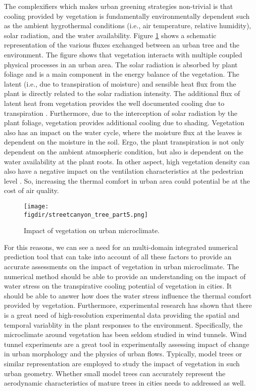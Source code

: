 The complexifiers which makes urban greening strategies non-trivial is that cooling provided by vegetation is fundamentally environmentally dependent such as the ambient hygrothermal conditions (i.e., air temperature, relative humidity), solar radiation, and the water availability. Figure \ref{fig:vegetation_fluxes} shows a schematic representation of the various fluxes exchanged between an urban tree and the environment. The figure shows that vegetation interacts with multiple coupled physical processes in an urban area. The solar radiation is absorbed by plant foliage and is a main component in the energy balance of the vegetation. The latent (i.e., due to transpiration of moisture) and sensible heat flux from the plant is directly related to the solar radiation intensity. The additional flux of latent heat from vegetation provides the well documented cooling due to transpiration \citep{Oke2017,Farquhar2007, abtew2012evaporation,Melesse2008}. Furthermore, due to the interception of solar radiation by the plant foliage, vegetation provides additional cooling due to shading. Vegetation also has an impact on the water cycle, where the moisture flux at the leaves is dependent on the moisture in the soil. Ergo, the plant transpiration is not only dependent on the ambient atmospheric condition, but also is dependent on the water availability at the plant roots. In other aspect, high vegetation density can also have a negative impact on the ventilation characteristics at the pedestrian level \citep{Gromke2011,Gromke2008}. So, increasing the thermal comfort in urban area could potential be at the cost of air quality. 

\begin{figure}[t]
	\centering
	\texttt{[image: \\figdir/streetcanyon\_tree\_part5.png]}
	\caption{Impact of vegetation on urban microclimate.}
	\label{fig:vegetation_fluxes}
\end{figure}


For this reasons, we can see a need for an multi-domain integrated numerical prediction tool that can take into account of all these factors to provide an accurate assessments on the impact of vegetation in urban microclimate. The numerical method should be able to provide an understanding on the impact of water stress on the transpirative cooling potential of vegetation in cities. It should be able to answer how does the water stress influence the thermal comfort provided by vegetation. Furthermore, experimental research has shown that there is a great need of high-resolution experimental data providing the spatial and temporal variablity in the plant responses to the environment. Specifically, the microclimate around vegetation has been seldom studied in wind tunnels. Wind tunnel experiments are a great tool in experimentally assessing impact of change in urban morphology and the physics of urban flows. Typically, model trees or similar representation are employed to study the impact of vegetation in such urban geometry. Whether small model trees can accurately represent the aerodynamic characteristics of mature trees in cities needs to addressed as well. 

